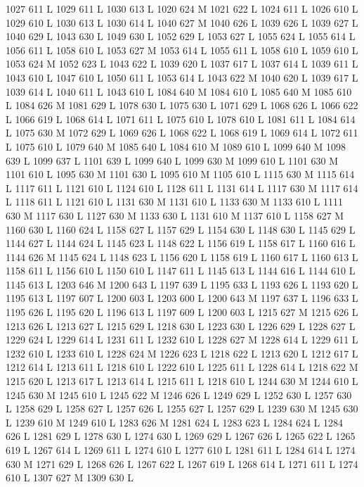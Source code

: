 {{{{{{{{{{{{{{{{{{{{{{{{{{{1027 611 L
1029 611 L
1030 613 L
1020 624 M 1021 622 L
1024 611 L
1026 610 L
1029 610 L
1030 613 L
1030 614 L
1040 627 M 1040 626 L
1039 626 L
1039 627 L
1040 629 L
1043 630 L
1049 630 L
1052 629 L
1053 627 L
1055 624 L
1055 614 L
1056 611 L
1058 610 L
1053 627 M 1053 614 L
1055 611 L
1058 610 L
1059 610 L
1053 624 M 1052 623 L
1043 622 L
1039 620 L
1037 617 L
1037 614 L
1039 611 L
1043 610 L
1047 610 L
1050 611 L
1053 614 L
1043 622 M 1040 620 L
1039 617 L
1039 614 L
1040 611 L
1043 610 L
1084 640 M 1084 610 L
1085 640 M 1085 610 L
1084 626 M 1081 629 L
1078 630 L
1075 630 L
1071 629 L
1068 626 L
1066 622 L
1066 619 L
1068 614 L
1071 611 L
1075 610 L
1078 610 L
1081 611 L
1084 614 L
1075 630 M 1072 629 L
1069 626 L
1068 622 L
1068 619 L
1069 614 L
1072 611 L
1075 610 L
1079 640 M 1085 640 L
1084 610 M 1089 610 L
1099 640 M 1098 639 L
1099 637 L
1101 639 L
1099 640 L
1099 630 M 1099 610 L
1101 630 M 1101 610 L
1095 630 M 1101 630 L
1095 610 M 1105 610 L
1115 630 M 1115 614 L
1117 611 L
1121 610 L
1124 610 L
1128 611 L
1131 614 L
1117 630 M 1117 614 L
1118 611 L
1121 610 L
1131 630 M 1131 610 L
1133 630 M 1133 610 L
1111 630 M 1117 630 L
1127 630 M 1133 630 L
1131 610 M 1137 610 L
1158 627 M 1160 630 L
1160 624 L
1158 627 L
1157 629 L
1154 630 L
1148 630 L
1145 629 L
1144 627 L
1144 624 L
1145 623 L
1148 622 L
1156 619 L
1158 617 L
1160 616 L
1144 626 M 1145 624 L
1148 623 L
1156 620 L
1158 619 L
1160 617 L
1160 613 L
1158 611 L
1156 610 L
1150 610 L
1147 611 L
1145 613 L
1144 616 L
1144 610 L
1145 613 L
1203 646 M 1200 643 L
1197 639 L
1195 633 L
1193 626 L
1193 620 L
1195 613 L
1197 607 L
1200 603 L
1203 600 L
1200 643 M 1197 637 L
1196 633 L
1195 626 L
1195 620 L
1196 613 L
1197 609 L
1200 603 L
1215 627 M 1215 626 L
1213 626 L
1213 627 L
1215 629 L
1218 630 L
1223 630 L
1226 629 L
1228 627 L
1229 624 L
1229 614 L
1231 611 L
1232 610 L
1228 627 M 1228 614 L
1229 611 L
1232 610 L
1233 610 L
1228 624 M 1226 623 L
1218 622 L
1213 620 L
1212 617 L
1212 614 L
1213 611 L
1218 610 L
1222 610 L
1225 611 L
1228 614 L
1218 622 M 1215 620 L
1213 617 L
1213 614 L
1215 611 L
1218 610 L
1244 630 M 1244 610 L
1245 630 M 1245 610 L
1245 622 M 1246 626 L
1249 629 L
1252 630 L
1257 630 L
1258 629 L
1258 627 L
1257 626 L
1255 627 L
1257 629 L
1239 630 M 1245 630 L
1239 610 M 1249 610 L
1283 626 M 1281 624 L
1283 623 L
1284 624 L
1284 626 L
1281 629 L
1278 630 L
1274 630 L
1269 629 L
1267 626 L
1265 622 L
1265 619 L
1267 614 L
1269 611 L
1274 610 L
1277 610 L
1281 611 L
1284 614 L
1274 630 M 1271 629 L
1268 626 L
1267 622 L
1267 619 L
1268 614 L
1271 611 L
1274 610 L
1307 627 M 1309 630 L
}}}}}}}}}}}}}}}}}}}}}}}}}}}

